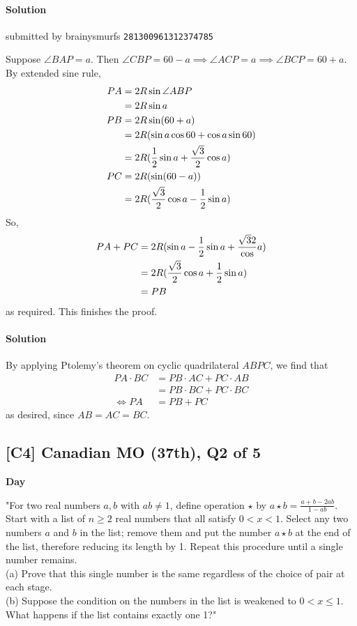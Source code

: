 \documentclass[10pt]{article}
\newcommand{\themonth}{March}
\newcommand{\theyear}{2019}
\newcounter{day}
\newcounter{solution}
\newcounter{datenumber}
\newcommand{\problem}[4][0]{
	\newpage
	\subsection{[#3] \space #2} \hfill 
	{\large\textbf{Day \arabic{day}}} %
	\begin{flushleft} #4 \end{flushleft}
	\vspace{1em}
	\addtocounter{day}{1}
	\addtocounter{datenumber}{1}
	\setcounter{solution}{1}
}
\newcommand{\solution}[4][0]{
	\paragraph{Solution \arabic{solution}} \hfill submitted by #2 \hfill \texttt{#3}
	\begin{flushleft} #4 \end{flushleft}
	\addtocounter{solution}{1}
	\vspace{1em}
}
\newcommand{\anonsolution}[2][0]{
	\paragraph{Solution \arabic{solution}} 
	\begin{flushleft} #2 \end{flushleft}
	\addtocounter{solution}{1}
	\vspace{1em}
}
\begin{document}
\solution[37]{brainysmurfs}{281300961312374785}{
Suppose $\angle BAP = a$. Then $\angle CBP = 60 - a \implies \angle ACP = a \implies \angle BCP = 60 + a$. \\
By extended sine rule, 
\begin{equation}
$$\begin{align*}
PA &= 2R \sin \angle ABP\\
&= 2R \sin a\\
PB &= 2R \sin (60 + a) \\
&= 2R (\sin a \cos 60 + \cos a \sin 60)\\
&= 2R(\frac{1}{2}\sin a + \frac{\sqrt{3}}{2}\cos a)\\
PC &= 2R(\sin(60 - a))\\
&= 2R(\frac{\sqrt{3}}{2} \cos a - \frac{1}{2}\sin a)
\end{align*}$$\end{equation}
So, 
\begin{equation}
$$\begin{align*}
PA+PC &= 2R(\sin a - \frac{1}{2} \sin a + \frac{\sqrt{3}{2}} \cos a)\\
&= 2R(\frac{\sqrt{3}}{2} \cos a + \frac{1}{2} \sin a)\\
&= PB \\
\end{align*}$$
\end{equation}
as required. This finishes the proof. 
}

\renewcommand{\themonth}{May}
\setcounter{datenumber}{1}

\anonsolution[37]{By applying Ptolemy's theorem on cyclic quadrilateral \(ABPC\), we find that \begin{align*} PA\cdot BC&= PB\cdot AC+PC\cdot AB \\ &= PB\cdot BC +PC\cdot BC \\ \iff PA&=PB+PC \end{align*} as desired, since \(AB=AC=BC\).}

\problem[38]{2007 Canadian MO (37th), Q2 of 5}{C4}{"For two real numbers $a,b$ with $ab \neq 1$, define operation $\star$ by $a \star b = \frac{a + b - 2ab}{1 - ab}$. Start with a list of $n \geq 2$ real numbers that all satisfy $0 < x < 1$. Select any two numbers $a$ and $b$ in the list; remove them and put the number $a \star b$ at the end of the list, therefore reducing its length by 1. Repeat this procedure until a single number remains.\\
	(a) Prove that this single number is the same regardless of the choice of pair at each stage.\\
	(b) Suppose the condition on the numbers in the list is weakened to $0 < x \leq 1$. What happens if the list contains exactly one 1?"}
\end{document}
